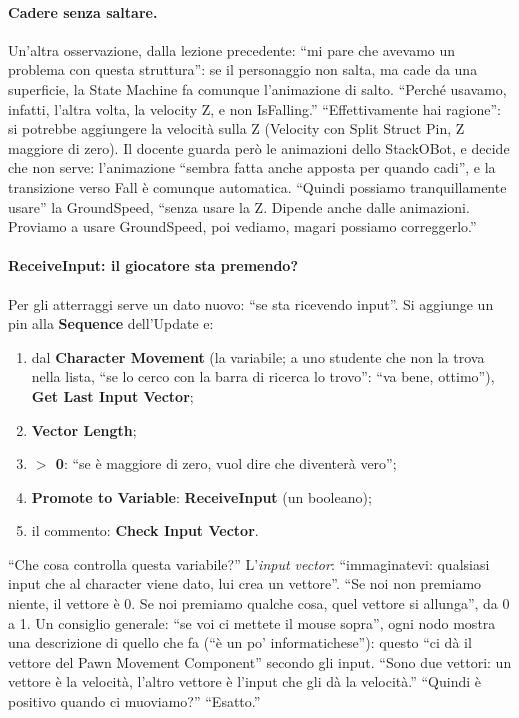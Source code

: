 \paragraph{Cadere senza saltare.} Un'altra osservazione, dalla lezione precedente: ``mi
pare che avevamo un problema con questa struttura'': se il personaggio non salta, ma cade
da una superficie, la State Machine fa comunque l'animazione di salto. ``Perché usavamo,
infatti, l'altra volta, la velocity Z, e non IsFalling.'' ``Effettivamente hai ragione'':
si potrebbe aggiungere la velocità sulla Z (Velocity con Split Struct Pin, Z maggiore di
zero). Il docente guarda però le animazioni dello StackOBot, e decide che non serve:
l'animazione ``sembra fatta anche apposta per quando cadi'', e la transizione verso Fall è
comunque automatica. ``Quindi possiamo tranquillamente usare'' la GroundSpeed, ``senza
usare la Z. Dipende anche dalle animazioni. Proviamo a usare GroundSpeed, poi vediamo,
magari possiamo correggerlo.''

\paragraph{ReceiveInput: il giocatore sta premendo?} Per gli atterraggi serve un dato
nuovo: ``se sta ricevendo input''. Si aggiunge un pin alla \textbf{Sequence}
dell'Update e:
\begin{enumerate}
  \item dal \textbf{Character Movement} (la variabile; a uno studente che non la trova
        nella lista, ``se lo cerco con la barra di ricerca lo trovo'': ``va bene,
        ottimo''), \textbf{Get Last Input Vector};
  \item \textbf{Vector Length};
  \item \textbf{$>$ 0}: ``se è maggiore di zero, vuol dire che diventerà vero'';
  \item \textbf{Promote to Variable}: \textbf{ReceiveInput} (un booleano);
  \item il commento: \textbf{Check Input Vector}.
\end{enumerate}
``Che cosa controlla questa variabile?'' L'\emph{input vector}: ``immaginatevi: qualsiasi
input che al character viene dato, lui crea un vettore''. ``Se noi non premiamo niente, il
vettore è 0. Se noi premiamo qualche cosa, quel vettore si allunga'', da 0 a 1. Un
consiglio generale: ``se voi ci mettete il mouse sopra'', ogni nodo mostra una descrizione
di quello che fa (``è un po' informatichese''): questo ``ci dà il vettore del Pawn
Movement Component'' secondo gli input. ``Sono due vettori: un vettore è la velocità,
l'altro vettore è l'input che gli dà la velocità.'' ``Quindi è positivo quando ci
muoviamo?'' ``Esatto.''

